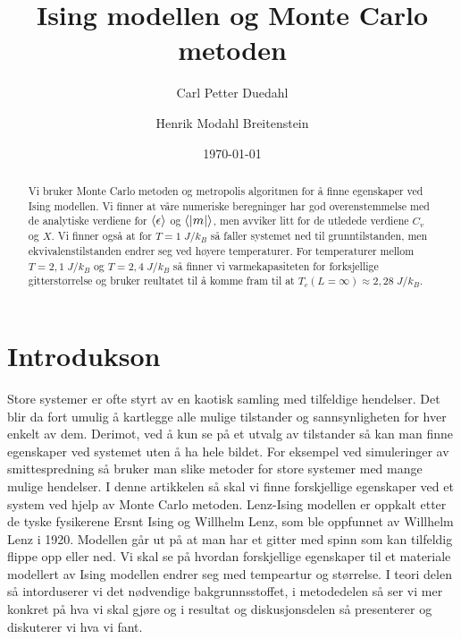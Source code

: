 \documentclass[reprint,english,notitlepage]{revtex4-2}  %
\begin{document}
\title{Ising modellen og Monte Carlo metoden}   %
\author{Carl Petter Duedahl}
\author{Henrik Modahl Breitenstein}               %
\date{\today}                             %
\noaffiliation                            %
\begin{abstract}                          %
Vi bruker Monte Carlo metoden og metropolis algoritmen for å finne egenskaper ved Ising modellen. Vi finner at våre numeriske beregninger har god overenstemmelse med de analytiske verdiene for $\expval{\epsilon}$ og $\expval{|m|}$, men avviker litt for de utledede verdiene $C_v$ og $X$. Vi finner også at for $T = 1 \; J/k_B$ så faller systemet ned til grunntilstanden, men ekvivalenstilstanden endrer seg ved høyere temperaturer. For temperaturer mellom $T = 2,1 \; J/k_B$ og $T = 2,4 \; J/k_B$ så finner vi varmekapasiteten for forksjellige gitterstørrelse og bruker reultatet til å komme fram til at $T_c \left ( L = \infty \right ) \approx 2,28 \; J/k_B$.%
\end{abstract}                            %
\maketitle                                %

\section{Introdukson}

Store systemer er ofte styrt av en kaotisk samling med tilfeldige hendelser. Det blir da fort umulig å kartlegge alle mulige tilstander og sannsynligheten for hver enkelt av dem. Derimot, ved å kun se på et utvalg av tilstander så kan man finne egenskaper ved systemet uten å ha hele bildet. For eksempel ved simuleringer av smittespredning så bruker man slike metoder for store systemer med mange mulige hendelser. I denne artikkelen så skal vi finne forskjellige egenskaper ved et system ved hjelp av Monte Carlo metoden. Lenz-Ising modellen er oppkalt etter de tyske fysikerene Ersnt Ising og Willhelm Lenz, som ble oppfunnet av Willhelm Lenz i 1920. Modellen går ut på at man har et gitter med spinn som kan tilfeldig flippe opp eller ned. Vi skal se på hvordan forskjellige egenskaper til et materiale modellert av Ising modellen endrer seg med tempeartur og størrelse. I teori delen så intorduserer vi det nødvendige bakgrunnsstoffet, i metodedelen så ser vi mer konkret på hva vi skal gjøre og i resultat og diskusjonsdelen så presenterer og diskuterer vi hva vi fant.
\end{document}
